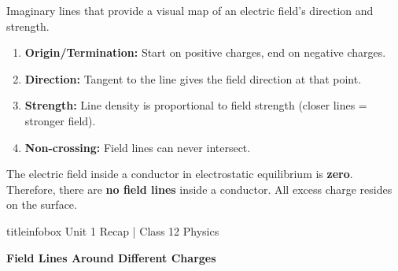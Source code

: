 \begin{frame}
\begin{frame}
\vspace{-0.05cm}

\begin{keybox}
\vspace{0.1cm}
Imaginary lines that provide a visual map of an electric field's direction and strength.
\end{keybox}

\vspace{0.35cm}

\begin{examplebox}
\vspace{0.1cm}
\begin{enumerate}
    \item \textbf{Origin/Termination:} Start on positive charges, end on negative charges.
    \item \textbf{Direction:} Tangent to the line gives the field direction at that point.
    \item \textbf{Strength:} Line density is proportional to field strength (closer lines = stronger field).
    \item \textbf{Non-crossing:} Field lines can never intersect.
\end{enumerate}
\vspace{0.1cm}
\end{examplebox}

\vspace{0.35cm}

\begin{importantbox}
\vspace{0.1cm}
The electric field inside a conductor in electrostatic equilibrium is \textbf{zero}. Therefore, there are \textbf{no field lines} inside a conductor. All excess charge resides on the surface.
\vspace{0.1cm}
\end{importantbox}

\vfill

\begin{beamercolorbox}[wd=\textwidth,ht=0.5cm,dp=0.1cm,center]{titleinfobox}
    \small\color{coolgray} Unit 1 Recap | Class 12 Physics
\end{beamercolorbox}
\end{frame}

\begin{frame}{\textbf{Field Lines Around Different Charges}}


\end{frame}
\end{frame}
